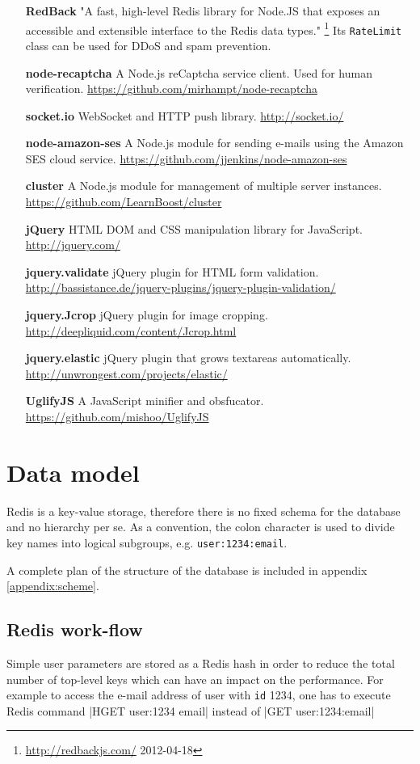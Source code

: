 \documentclass[12pt,oneside]{fithesis}
\begin{document}
\begin{itemize}
			\item[\textbf{RedBack}] "A fast, high-level Redis library for Node.JS that exposes an accessible and extensible interface to the Redis data types." \footnote{\url{http://redbackjs.com/} 2012-04-18} Its \texttt{RateLimit} class can be used for DDoS and spam prevention. 
			\item[\textbf{node-recaptcha}] A Node.js reCaptcha service client. Used for human verification. \url{https://github.com/mirhampt/node-recaptcha}
			\item[\textbf{socket.io}] WebSocket and HTTP push library. \url{http://socket.io/}
			\item[\textbf{node-amazon-ses}] A Node.js module for sending e-mails using the Amazon SES cloud service. \url{https://github.com/jjenkins/node-amazon-ses}
			\item[\textbf{cluster}] A Node.js module for management of multiple server instances. \url{https://github.com/LearnBoost/cluster}
			\item[\textbf{jQuery}] HTML DOM and CSS manipulation library for JavaScript. \url{http://jquery.com/}
			\item[\textbf{jquery.validate}] jQuery plugin for HTML form validation. \url{http://bassistance.de/jquery-plugins/jquery-plugin-validation/}
			\item[\textbf{jquery.Jcrop}] jQuery plugin for image cropping. \url{http://deepliquid.com/content/Jcrop.html}
			\item[\textbf{jquery.elastic}] jQuery plugin that grows textareas automatically. \url{http://unwrongest.com/projects/elastic/}
			\item[\textbf{UglifyJS}] A JavaScript minifier and obsfucator. \url{https://github.com/mishoo/UglifyJS}
		\end{itemize}
\section{Data model}
	Redis is a key-value storage, therefore there is no fixed schema for the database and no hierarchy per se.  As a convention, the colon character is used to divide key names into logical subgroups, e.g. \texttt{user:1234:email}. 
	
	A complete plan of the structure of the database is included in appendix \ref{appendix:scheme}.
	\subsection{Redis work-flow}
	Simple user parameters are stored as a Redis hash in order to reduce the total number of top-level keys which can have an impact on the performance. For example to access the e-mail address of user with \texttt{id} 1234, one has to execute Redis command |HGET user:1234 email| instead of |GET user:1234:email|
	
\end{document}
